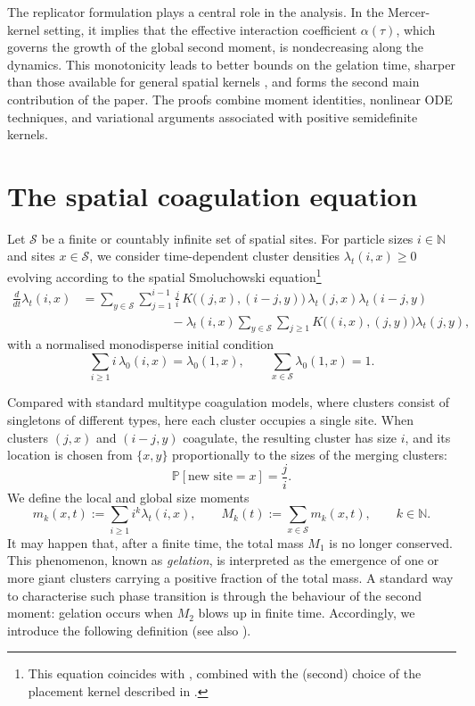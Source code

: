 \documentclass[12pt,twoside]{article}
\begin{document}
The replicator formulation plays a central role in the analysis. In the Mercer-kernel setting, it implies that the effective interaction coefficient $\alpha(\tau)$, which governs the growth of the global second moment, is nondecreasing along the dynamics. This monotonicity leads to better bounds on the gelation time, sharper than those available for general spatial kernels \cite[Theorem~2.2 (ii)]{norris-cluster-coag}, and forms the second main contribution of the paper. The proofs combine moment identities, nonlinear ODE techniques, and variational arguments associated with positive semidefinite kernels.

\section{The spatial coagulation equation}\label{sub:modA}

Let $\mathcal S$ be a finite or countably infinite set of spatial sites.  
For particle sizes $i\in\mathbb N$ and sites $x\in\mathcal S$, we consider time-dependent cluster densities $\lambda_t(i,x)\ge 0$ evolving according to the spatial Smoluchowski equation\footnote{This equation coincides with \cite[Eq.~(7.22)]{AKLP23}, combined with the (second) choice of the placement kernel described in \cite[Remark~1.1]{AKLP23}.}
\begin{equation}\label{SE1}
\begin{aligned}
\frac{d}{dt}\lambda_t(i,x)
&=
\sum_{y\in\mathcal S}\sum_{j=1}^{i-1}
\frac{j}{i}\,
K\bigl((j,x),(i-j,y)\bigr)\,
\lambda_t(j,x)\lambda_t(i-j,y)\\
&\hspace{3cm}-
\lambda_t(i,x)
\sum_{y\in\mathcal S}\sum_{j\ge1}
K\bigl((i,x),(j,y)\bigr)\lambda_t(j,y),
\end{aligned}
\end{equation}
with a normalised monodisperse initial condition
\begin{equation}\label{IC}
\sum_{i\ge1} i\,\lambda_0(i,x)=\lambda_0(1,x),
\qquad
\sum_{x\in\mathcal S}\lambda_0(1,x)=1.
\end{equation}

Compared with standard multitype coagulation models, where clusters consist of singletons of different types, here each cluster occupies a single site. When clusters $(j,x)$ and $(i-j,y)$ coagulate, the resulting cluster has size $i$, and its location is chosen from $\{x,y\}$ proportionally to the sizes of the merging clusters:
\[
\mathbb P[\text{new site}=x]=\frac{j}{i}.
\]
We define the local and global size moments
\begin{equation}\label{moments}
m_k(x,t):=\sum_{i\ge1} i^k\lambda_t(i,x),
\qquad
M_k(t):=\sum_{x\in\mathcal S} m_k(x,t),
\qquad k\in\mathbb N.
\end{equation}
It may happen that, after a finite time, the total mass $M_1$ is no longer conserved. This phenomenon, known as \emph{gelation}, is interpreted as the emergence of one or more giant clusters carrying a positive fraction of the total mass. A standard way to characterise such phase transition is through the behaviour of the second moment: gelation occurs when $M_2$ blows up in finite time. Accordingly, we introduce the following definition (see also \cite[Def.~2(b)]{jeon98}).
\end{document}
